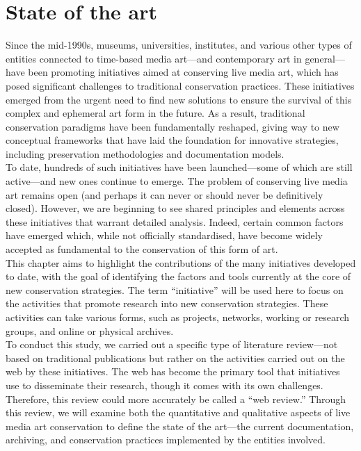 \chapter{\label{ch:1-state_of_the_art}State of the art}

Since the mid-1990s, museums, universities, institutes, and various other types of entities connected to time-based media art—and contemporary art in general—have been promoting initiatives aimed at conserving live media art, which has posed significant challenges to traditional conservation practices. These initiatives emerged from the urgent need to find new solutions to ensure the survival of this complex and ephemeral art form in the future. As a result, traditional conservation paradigms have been fundamentally reshaped, giving way to new conceptual frameworks that have laid the foundation for innovative strategies, including preservation methodologies and documentation models.\\
To date, hundreds of such initiatives have been launched—some of which are still active—and new ones continue to emerge. The problem of conserving live media art remains open (and perhaps it can never or should never be definitively closed). However, we are beginning to see shared principles and elements across these initiatives that warrant detailed analysis. Indeed, certain common factors have emerged which, while not officially standardised, have become widely accepted as fundamental to the conservation of this form of art.\\
This chapter aims to highlight the contributions of the many initiatives developed to date, with the goal of identifying the factors and tools currently at the core of new conservation strategies. The term ``initiative'' will be used here to focus on the activities that promote research into new conservation strategies. These activities can take various forms, such as projects, networks, working or research groups, and online or physical archives.\\
To conduct this study, we carried out a specific type of literature review—not based on traditional publications but rather on the activities carried out on the web by these initiatives. The web has become the primary tool that initiatives use to disseminate their research, though it comes with its own challenges. Therefore, this review could more accurately be called a ``web review.'' Through this review, we will examine both the quantitative and qualitative aspects of live media art conservation to define the state of the art—the current documentation, archiving, and conservation practices implemented by the entities involved.\\
